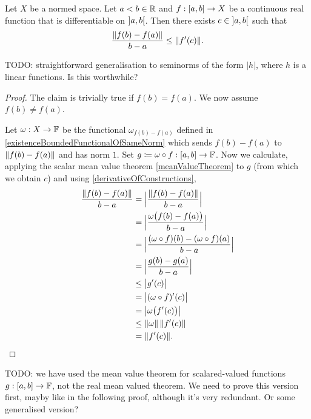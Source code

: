 \begin{proposition} \label{meanValueTheoremVectorFunctions}
Let $X$ be a normed space. Let $a<b\in \mathbb{R}$ and $f: \interval{a,b}\to X$ be a continuous real function that is differentiable on $\interval[o]{a,b}$. Then there exists $c\in \interval[o]{a,b}$ such that
\[ \frac{\lVert f(b)-f(a)\rVert}{b-a} \leq \lVert f'(c)\rVert. \]
\end{proposition}
TODO: straightforward generalisation to seminorms of the form $|h|$, where $h$ is a linear functions. Is this worthwhile?
\begin{proof}
The claim is trivially true if $f(b) = f(a)$. We now assume $f(b) \neq f(a)$.

Let $\omega: X\to \mathbb{F}$ be the functional $\omega_{f(b)-f(a)}$ defined in \ref{existenceBoundedFunctionalOfSameNorm} which sends $f(b)-f(a)$ to $\lVert f(b)-f(a)\rVert$ and has norm $1$. 
Set $g \defeq \omega \circ f: \interval{a,b}\to \F$.
Now we calculate, applying the scalar mean value theorem \ref{meanValueTheorem} to $g$ (from which we obtain $c$) and using \ref{derivativeOfConstructions},
\begin{align*}
\frac{\lVert f(b)-f(a)\rVert}{b-a} &= \Big|\frac{\lVert f(b)-f(a)\rVert}{b-a}\Big| \\
&= \Big|\frac{\omega\big(f(b)-f(a)\big)}{b-a}\Big| \\
&= \Big|\frac{(\omega\circ f)(b)-(\omega \circ f)(a)}{b-a}\Big| \\
&= \Big|\frac{g(b)- g(a)}{b-a}\Big| \\
&\leq \big|g'(c)\big| \\
&= \big|(\omega \circ f)'(c)\big| \\
&= \big|\omega\big(f'(c)\big)\big| \\
&\leq \lVert\omega\rVert\,\lVert f'(c)\rVert \\
&= \lVert f'(c)\rVert.
\end{align*}
\end{proof}
TODO: we have used the mean value theorem for scalared-valued functions $g: \interval{a,b}\to \F$, not the real mean valued theorem. We need to prove this version first, mayby like in the following proof, although it's very redundant. Or some generalised version?

